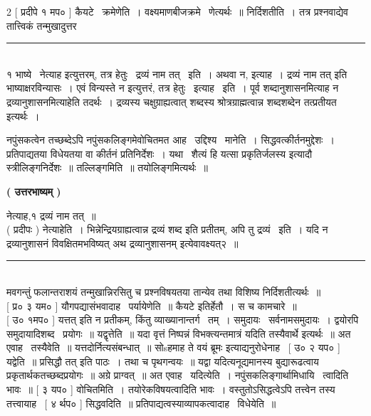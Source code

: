 \documentclass[11pt, openany]{book}
\begin{document}
\begin{multicols}{2}
 [ प्रदीपे १ मप० ] कैयटे \textendash\ क्रमेणेति~। वक्ष्यमाणबीजक्रमे \textendash\ णेत्यर्थः~॥ निर्दिशतीति~। तत्र प्रश्नवाद्येव तात्त्विकं तन्मुखादुत्तर \textendash\

\noindent
\rule{1\linewidth}{0.5pt}\\

१ भाष्ये \textendash\ नेत्याह इत्युत्तरम्, तत्र हेतुः \textendash\ द्रव्यं नाम तत् \textendash\ इति~। अथवा {\qt न, इत्याह~। द्रव्यं नाम तत्} इति भाष्याक्षरविन्यासः~। एवं विन्यस्ते {\qt न} इत्युत्तरं, तत्र हेतुः \textendash\ इत्याह \textendash\ इति~। पूर्व शब्दानुशासनमित्याह न द्रव्यानुशासनमित्याहेति तदर्थः~। द्रव्यस्य चक्षुग्राह्यत्वात् शब्दस्य श्रोत्रग्राह्मत्वान्न शब्दशब्देन तत्प्रतीयत इत्यर्थः~।

\columnbreak

\noindent
नपुंसकत्वेन तच्छब्देऽपि नपुंसकलिङ्गमेवोचितमत आह \textendash\ उद्दिश्य \textendash\ मानेति~। सिद्धवत्कीर्तनमुद्देशः~। प्रतिपाद्यतया विधेयतया वा कीर्तनं प्रतिनिर्देशः~। यथा \textendash\ {\qt शैत्यं हि यत्सा प्रकृतिर्जलस्य} इत्यादौ स्त्रीलिङ्गनिर्देशः~॥ तल्लिङ्गमिति~॥ तयोलिङ्गमित्यर्थः~॥ 

\begin{center}
\textbf{ ( उत्तरभाष्यम् ) }
\end{center}

नेत्याह,१ द्रव्यं नाम तत्~॥\\

 ( प्रदीपः ) नेत्याहेति~। भिन्नेन्द्रियग्राह्यत्वान्न द्रव्यं शब्द इति प्रतीतम्, अपि तु द्रव्यं \textendash\ इति~। यदि न द्रव्यानुशासनं विवक्षितमभविष्यत् अथ द्रव्यानुशासनम् इत्येवावक्ष्यत्२~॥

\noindent
\rule{1\linewidth}{0.5pt}\\

\noindent
मवगन्तुं फलान्तराशयं तन्मुखान्निरसितु च प्रश्नविषयतया तान्येव तथा विशिष्य निर्दिशतीत्यर्थः~॥\\

 [ प्र० ३ यम० ] यौगपद्यासंभवादाह \textendash\ पर्यायेणेति~॥ कैयटे इतिर्हेतौ~। स च कामचारे~॥\\

 [ उ० १मप० ] {\qt यत्तत्} इति न प्रतीकम्, किंतु व्याख्यानान्तर्ग \textendash\ तम्~। समुदायः \textendash\ सर्वनामसमुदायः~। द्वयोरपि समुदायादिशब्द \textendash\ प्रयोगः~॥ यद्वृत्तेति~॥ यदा वृत्तं निष्पन्नं विभक्त्यन्तमात्रं यदिति तस्यैवार्थे इत्यर्थः~॥ अत एवाह \textendash\ तस्यैवेति~॥ यत्तदोर्नित्यसंबन्धात्~॥ {\qt सोsहमाह} ते वयं ब्रूमः इत्याद्यनुरोधेनाह \textendash\ [ उ० २ यप० ] यद्वेति~॥ {\qt प्रसिद्धौ तत्} इति पाठः~। तथा च पृथगन्वयः~॥ यद्वा यदित्यनूद्यमानस्य बुद्यारूढत्वाय प्रकृतार्थकतच्छब्दप्रयोगः~॥ अग्रे प्राग्वत्~॥ अत एवाह \textendash\ यदित्येति~। नपुंसकलिङ्गार्थामिधायि \textendash\ त्वादिति भावः~॥ [ ३ यप० ] वोचितमिति~। तयोरेकविषयत्वादिति भावः~। वस्तुतोऽसिद्धत्वेऽपि तत्त्वेन तस्य तत्त्वायाह \textendash\ [ ४ र्थप० ] सिद्धवदिति~॥ प्रतिपाद्यत्वस्याव्यापकत्वादाह \textendash\ विधेयेति~॥\\


\end{multicols}
\end{document}
